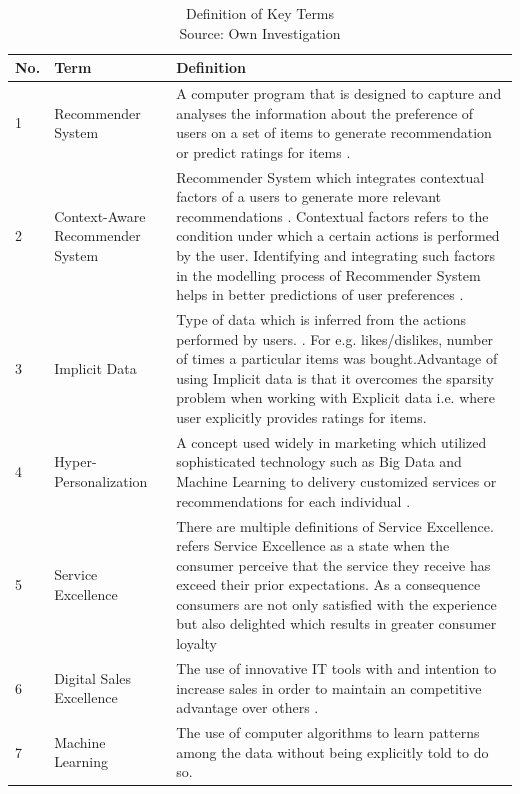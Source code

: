 \begin{table}
\begin{tabular}{ |m{0.5cm}| m{3cm} | m{10cm}| } 
\hline 
No. & Term & Definition \\ 
\hline \hline
1 & Recommender System & A computer program that is designed to capture and analyses the information about the preference of users on a set of items to generate recommendation or predict ratings for items \autocite[1]{SchaferJoshephKonstan1999}.   \\ 
\hline
2 & Context-Aware Recommender System & Recommender System which integrates contextual factors of a users to generate more relevant recommendations \autocite[67]{Adomavicius2011}. Contextual factors refers to the condition under which a certain actions is performed by the user. Identifying and integrating such factors in the modelling process of Recommender System helps in better predictions of user preferences \autocite[68]{Adomavicius2011}. \\ 
\hline
3 & Implicit Data & Type of data which is inferred from the actions performed by users.   \autocite[2]{oard1998implicit}. For e.g. likes/dislikes, number of times a particular items was bought.Advantage of using Implicit data is that it overcomes the sparsity problem when working with Explicit data i.e. where user explicitly provides ratings for items. \\ 
\hline

4 & Hyper-Personalization & A concept used widely in marketing which utilized sophisticated technology such as Big Data and Machine Learning to delivery customized services or recommendations for each individual \autocite[5]{CapgeminiconsultingESSECBusinessSchool2016}. \\
\hline

5 & Service Excellence & There are multiple definitions of Service Excellence. \textcite[]{Horwitz1996} refers Service Excellence as a state when the consumer perceive that the service they receive has exceed their prior expectations. As a consequence consumers are not only satisfied with the experience but also delighted which results in greater consumer loyalty \autocite[448]{Gouthier2012}\\
\hline
6 & Digital Sales Excellence & The use of innovative IT tools with and intention to increase sales in order to maintain an competitive advantage over others \autocite[5]{Binckebanck2016}. \\
\hline
7 & Machine Learning & The use of computer algorithms to learn patterns among the data without being explicitly told to do so.\\
\hline
\end{tabular}
\label{table:definition}
\caption{Definition of Key Terms \\
Source: Own Investigation}
\end{table}


